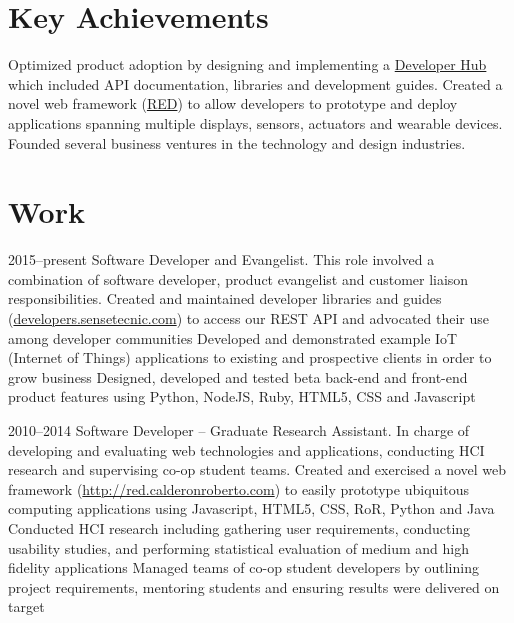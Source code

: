\documentclass[full]{rvca}
\begin{document}
\section{Key Achievements}

\achievements
{Optimized product adoption by designing and implementing a \href{http://developers.sensetecnic.com/}{Developer Hub} which included API documentation, libraries and development guides.}
{Created a novel web framework (\href{http://red.calderonroberto.com}{RED}) to allow developers 
to prototype and deploy applications spanning multiple displays, sensors, actuators and wearable devices.}
{Founded several business ventures in the technology and design industries.}
{}

\section{Work}


{2015--present}%
{Software Developer and Evangelist.} %
{This role involved a combination of software developer, product evangelist and customer liaison responsibilities.}%
{Created and maintained developer libraries and guides (\href{http://developers.sensetecnic.com}{developers.sensetecnic.com}) to access our REST API and advocated their use among developer communities}
{Developed and demonstrated example IoT (Internet of Things) applications to existing and prospective clients in order to grow business}
{Designed, developed and tested beta back-end and front-end product features using Python, NodeJS, Ruby, HTML5, CSS and Javascript}
{}
{}

{2010--2014}%
{Software Developer -- Graduate Research Assistant.} %
{In charge of developing and evaluating web technologies and applications, conducting HCI research and supervising co-op student teams.} %
{Created and exercised a novel web framework (\href{http://red.calderonroberto.com}{http://red.calderonroberto.com}) to easily prototype ubiquitous computing applications  using Javascript, HTML5, CSS, RoR, Python and Java}
{Conducted HCI research including gathering user requirements, conducting usability studies, and performing statistical evaluation of medium and high fidelity applications}
{Managed teams of co-op student developers by outlining project requirements, mentoring students and ensuring results were delivered on target}
{}
{}
\end{document}

